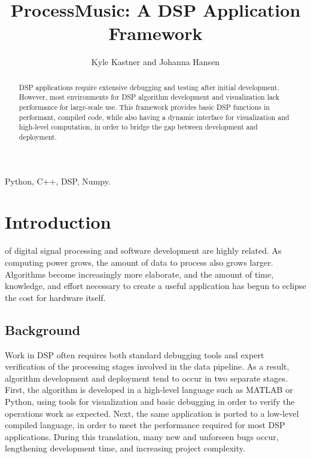 \documentclass[journal]{IEEEtran}
\begin{document}
\title{ProcessMusic: A DSP Application Framework}

\author{Kyle Kastner and Johanna Hansen}%

\maketitle

\begin{abstract}
DSP applications require extensive debugging and testing after initial development. However, most environments 
for DSP algorithm development and visualization lack performance for large-scale use.
This framework provides basic DSP functions in performant, compiled code, while also having a dynamic
interface for visualization and high-level computation, in order to bridge the gap between development and deployment. 
\end{abstract}

\begin{IEEEkeywords}
Python, C++, DSP, Numpy.
\end{IEEEkeywords}

\IEEEpeerreviewmaketitle
\section{Introduction}
 of digital signal processing and software development are highly related. As computing power
grows, the amount of data to process also grows larger. Algorithms become increasingly more elaborate, and the amount of time, knowledge,
and effort necessary to create a useful application has begun to eclipse the cost for hardware itself.

\subsection{Background}
Work in DSP often requires both standard debugging tools and expert verification of the processing stages involved 
in the data pipeline. As a result, algorithm development and deployment tend to occur in two separate stages.
First, the algorithm is developed in a high-level language such as MATLAB or Python, using tools for visualization 
and basic debugging in order to verify the operations work as expected. Next, the same application is ported to a low-level compiled
language, in order to meet the performance required for most DSP applications. During this translation, many new and
unforseen bugs occur, lengthening development time, and increasing project complexity. 
\end{document}
